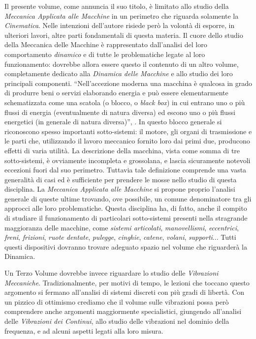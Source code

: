 \noindent 
Il presente volume, come annuncia il suo titolo, \`e limitato
allo studio 
della {\em Meccanica Applicata alle Macchine} in un perimetro
che riguarda solamente la {\em Cinematica}. Nelle 
intenzioni dell'autore risiede per\`o la volont\`a di esporre,
in ulteriori lavori,
altre parti fondamentali di questa materia. 
Il cuore dello studio della Meccanica delle Macchine \`e rappresentato
 dall'analisi 
del loro comportamento {\em dinamico} e di tutte le problematiche legate al loro
funzionamento: dovrebbe allora essere questo il contenuto di un altro
volume, completamente
dedicato alla {\em Dinamica delle Macchine} e allo studio dei loro
principali componenti.
``Nell'accezione moderna una macchina  \`e qualcosa in
grado di produrre beni o servizi elaborando energia e pu\`o essere elementarmente
schematizzata come una scatola (o blocco, o {\em black box}) in cui entrano uno o
pi\`u flussi di energia (eventualmente di natura diversa) ed escono uno
o pi\`u flussi energetici (in generale di natura diversa)'', \cite{giordana}.
In questo blocco generale si riconoscono spesso importanti sotto-sistemi:
il motore, gli organi di
trasmissione e le parti che, utilizzando il lavoro meccanico fornito loro 
dai primi due, producono effetti di varia utilit\`a.
La descrizione della macchina, vista come somma di
tre sotto-sistemi, \`e ovviamente incompleta
e grossolana, e lascia sicuramente notevoli eccezioni fuori dal suo perimetro.
Tuttavia tale definizione comprende una vasta generalit\`a di casi ed \`e
sufficiente per prendere
le mosse nello studio di questa disciplina. La {\em Meccanica Applicata alle Macchine}
si propone proprio l'analisi generale di queste ultime trovando, ove possibile,
un comune denominatore tra gli approcci alle loro problematiche.
Questa disciplina ha, di fatto, anche il compito di studiare
il funzionamento di particolari sotto-sistemi presenti nella stragrande
maggioranza 
delle macchine, come {\em sistemi articolati}, {\em manovellismi},
{\em eccentrici}, {\em freni}, {\em frizioni}, {\em ruote dentate},
{\em pulegge}, {\em cinghie}, {\em catene}, {\em volani}, {\em supporti}...
Tutti questi dispositivi dovranno trovare adeguato spazio
nel volume che riguarder\`a la Dinamica.
\vskip 2mm

\noindent Un Terzo Volume dovrebbe invece
riguardare  lo studio delle  {\em Vibrazioni Meccaniche}.
Tradizionalmente, per motivi di tempo,
le lezioni che toccano questo argomento
si fermano all'analisi di sistemi discreti con pi\`u gradi di libert\`a.
Con un pizzico di ottimismo crediamo che il volume sulle vibrazioni
possa per\`o comprendere anche argomenti maggiormente specialistici,
giungendo all'analisi delle 
{\em Vibrazioni
dei Continui}, allo studio delle vibrazioni nel dominio della frequenza,
e ad alcuni aspetti legati alla loro misura.
\vskip 2mm

